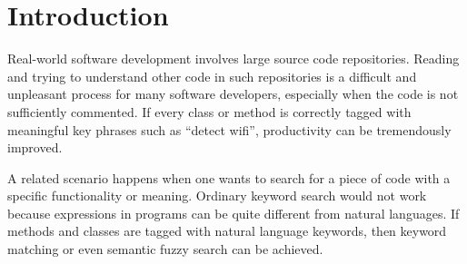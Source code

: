 \section{Introduction}
\label{sec:intro}


Real-world software development involves large source code repositories. Reading
and trying to understand other code in such repositories is a difficult and
unpleasant process for many software developers, especially when the code is not
sufficiently commented. If every class or method is correctly tagged with
meaningful key phrases such as ``detect wifi'', productivity can be
tremendously improved.


A related scenario happens when one wants to search for a piece of code with
a specific functionality or meaning. Ordinary keyword search would not work
because expressions in programs can be quite different from natural languages.
If methods and classes are tagged with natural language keywords, then
keyword matching or even semantic fuzzy search can be achieved.
%
%
%

